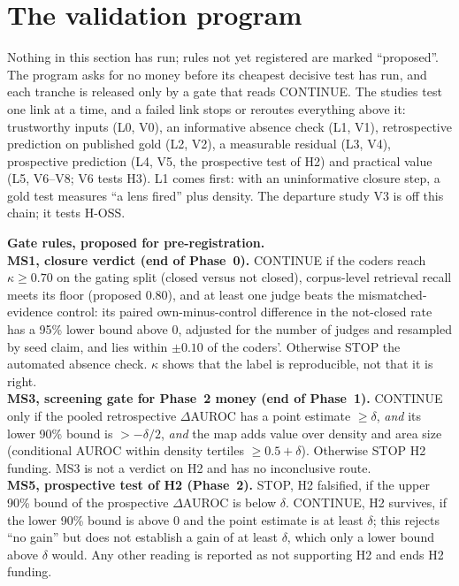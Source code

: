 \section{The validation program}\label{sec:validation}

\evfut{} Nothing in this section has run; rules not yet registered are marked \enquote{proposed}.
The program asks for no money before its
cheapest decisive test has run, and each tranche is released only by a gate that reads CONTINUE. The
studies test one link at a time, and a failed link stops or reroutes everything above it: trustworthy
inputs (L0, V0), an informative absence check (L1, V1), retrospective prediction on published gold (L2,
V2), a measurable residual (L3, V4), prospective prediction (L4, V5, the prospective test of H2) and practical
value (L5, V6--V8; V6 tests H3). \evint{} L1 comes first: with an uninformative closure step, a gold test
measures \enquote{a lens fired} plus density. The departure study V3 is off this chain; it tests H-OSS.

\begin{evfutbox}[float=tbp]
  \textbf{Gate rules, proposed for pre-registration.}\\[2pt]
  \textbf{MS1, closure verdict (end of Phase~0).} CONTINUE if the coders reach $\kappa \geq 0.70$ on
  the gating split (closed versus not closed), corpus-level retrieval recall meets its floor (proposed
  0.80), and at least one judge beats the mismatched-evidence control: its paired own-minus-control
  difference in the not-closed rate has a 95\% lower bound above 0, adjusted for the number of judges and
  resampled by seed claim, and lies within $\pm 0.10$ of the coders'. Otherwise STOP the automated
  absence check. $\kappa$ shows that the label is reproducible, not that it is right.\\[2pt]
  \textbf{MS3, screening gate for Phase~2 money (end of Phase~1).} CONTINUE only if the pooled
  retrospective $\Delta$AUROC has a point estimate $\geq \delta$, \emph{and} its lower 90\% bound is
  $> -\delta/2$, \emph{and} the map adds value over density and area size (conditional AUROC within
  density tertiles $\geq 0.5 + \delta$). Otherwise STOP H2 funding. MS3 is not a verdict on H2 and has no
  inconclusive route.\\[2pt]
  \textbf{MS5, prospective test of H2 (Phase~2).} STOP, H2 falsified, if the upper 90\% bound of the
  prospective $\Delta$AUROC is below $\delta$. CONTINUE, H2 survives, if the lower 90\% bound is above 0
  and the point estimate is at least $\delta$; this rejects \enquote{no gain} but does not establish a
  gain of at least $\delta$, which only a lower bound above $\delta$ would. Any other reading is reported
  as not supporting H2 and ends H2 funding.
\end{evfutbox}

